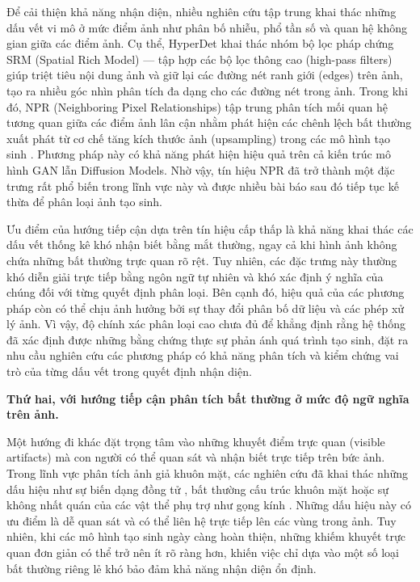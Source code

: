 \documentclass[12pt]{report}
\begin{document}
Để cải thiện khả năng nhận diện, nhiều nghiên cứu tập trung khai thác những dấu vết vi mô ở mức điểm ảnh như phân bố nhiễu, phổ tần số và quan hệ không gian giữa các điểm ảnh. Cụ thể, HyperDet \cite{cao2024hyperdet} khai thác nhóm bộ lọc pháp chứng SRM (Spatial Rich Model) — tập hợp các bộ lọc thông cao (high-pass filters) giúp triệt tiêu nội dung ảnh và giữ lại các đường nét ranh giới (edges) trên ảnh, tạo ra nhiều góc nhìn phân tích đa dạng cho các đường nét trong ảnh. Trong khi đó, NPR (Neighboring Pixel Relationships) tập trung phân tích mối quan hệ tương quan giữa các điểm ảnh lân cận nhằm phát hiện các chênh lệch bất thường xuất phát từ cơ chế tăng kích thước ảnh (upsampling) trong các mô hình tạo sinh \cite{tan2024rethinking}. Phương pháp này có khả năng phát hiện hiệu quả trên cả kiến trúc mô hình GAN lẫn Diffusion Models. Nhờ vậy, tín hiệu NPR đã trở thành một đặc trưng rất phổ biến trong lĩnh vực này và được nhiều bài báo sau đó tiếp tục kế thừa để phân loại ảnh tạo sinh. 

Ưu điểm của hướng tiếp cận dựa trên tín hiệu cấp thấp là khả năng khai thác các dấu vết thống kê khó nhận biết bằng mắt thường, ngay cả khi hình ảnh không chứa những bất thường trực quan rõ rệt. Tuy nhiên, các đặc trưng này thường khó diễn giải trực tiếp bằng ngôn ngữ tự nhiên và khó xác định ý nghĩa của chúng đối với từng quyết định phân loại. Bên cạnh đó, hiệu quả của các phương pháp còn có thể chịu ảnh hưởng bởi sự thay đổi phân bố dữ liệu và các phép xử lý ảnh. Vì vậy, độ chính xác phân loại cao chưa đủ để khẳng định rằng hệ thống đã xác định được những bằng chứng thực sự phản ánh quá trình tạo sinh, đặt ra nhu cầu nghiên cứu các phương pháp có khả năng phân tích và kiểm chứng vai trò của từng dấu vết trong quyết định nhận diện.

\textbf{Thứ hai, với hướng tiếp cận phân tích bất thường ở mức độ ngữ nghĩa trên ảnh.}

Một hướng đi khác đặt trọng tâm vào những khuyết điểm trực quan (visible artifacts) mà con người có thể quan sát và nhận biết trực tiếp trên bức ảnh. Trong lĩnh vực phân tích ảnh giả khuôn mặt, các nghiên cứu đã khai thác những dấu hiệu như sự biến dạng đồng tử \cite{guo2022eyes}, bất thường cấu trúc khuôn mặt \cite{yang2019exposing} hoặc sự không nhất quán của các vật thể phụ trợ như gọng kính \cite{nirkin2022deepfake}. Những dấu hiệu này có ưu điểm là dễ quan sát và có thể liên hệ trực tiếp lên các vùng trong ảnh. Tuy nhiên, khi các mô hình tạo sinh ngày càng hoàn thiện, những khiếm khuyết trực quan đơn giản có thể trở nên ít rõ ràng hơn, khiến việc chỉ dựa vào một số loại bất thường riêng lẻ khó bảo đảm khả năng nhận diện ổn định.
\end{document}
